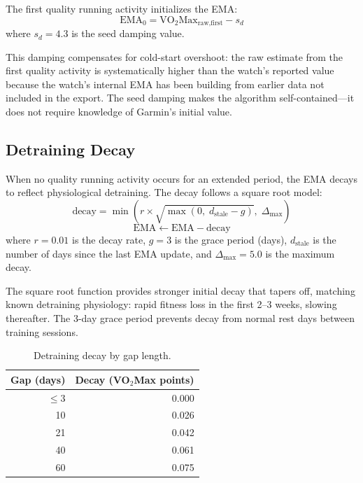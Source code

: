 \documentclass[11pt,a4paper]{article}
\begin{document}
The first quality running activity initializes the EMA:
\begin{equation}
\text{EMA}_0 = \text{VO}_2\text{Max}_{\text{raw,first}} - s_d
\label{eq:seed}
\end{equation}
where $s_d = 4.3$ is the seed damping value.

This damping compensates for cold-start overshoot: the raw estimate from the first quality activity is systematically higher than the watch's reported value because the watch's internal EMA has been building from earlier data not included in the export.
The seed damping makes the algorithm self-contained---it does not require knowledge of Garmin's initial value.


\subsection{Detraining Decay}
\label{sec:decay}

When no quality running activity occurs for an extended period, the EMA decays to reflect physiological detraining.
The decay follows a square root model:
\begin{equation}
\text{decay} = \min\!\left(r \times \sqrt{\max(0,\; d_{\text{stale}} - g)},\; \Delta_{\max}\right)
\label{eq:decay}
\end{equation}
\begin{equation}
\text{EMA} \leftarrow \text{EMA} - \text{decay}
\end{equation}
where $r = 0.01$ is the decay rate, $g = 3$ is the grace period (days), $d_{\text{stale}}$ is the number of days since the last EMA update, and $\Delta_{\max} = 5.0$ is the maximum decay.

The square root function provides stronger initial decay that tapers off, matching known detraining physiology: rapid fitness loss in the first 2--3 weeks, slowing thereafter.
The 3-day grace period prevents decay from normal rest days between training sessions.

\begin{table}[H]
\centering
\caption{Detraining decay by gap length.}
\label{tab:decay}
\begin{tabular}{@{}rr@{}}
\toprule
\textbf{Gap (days)} & \textbf{Decay (VO$_2$Max points)} \\
\midrule
$\leq 3$  & 0.000 \\
10         & 0.026 \\
21         & 0.042 \\
40         & 0.061 \\
60         & 0.075 \\
\bottomrule
\end{tabular}
\end{table}
\end{document}
